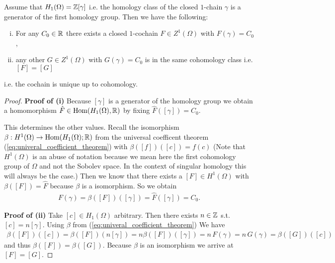 \documentclass[../main.tex]{subfiles}
\begin{document}
\begin{proposition}\label{prop:uniqueness_cochain}
    Assume that $H_1(\Omega) = \mathbb{Z} [\gamma]$ i.e. the homology 
    class of the 
    closed $1$-chain $\gamma$ is a generator of the first homology group.
    Then we have the following:
    \begin{enumerate}[(i)]
        \item For any $C_0 \in \mathbb{R}$ there exists a closed $1$-cochain 
            $F \in Z^1(\Omega)$ with $F(\gamma) = C_0$,
        \item any other $G \in Z^1(\Omega)$ with $G(\gamma) = C_0$ 
            is in the same cohomology class i.e. $[F] = [G]$
    \end{enumerate}
    i.e. the cochain is unique up to cohomology.
\end{proposition}
\begin{proof}
    \textbf{Proof of (i)} %
    Because $[\gamma]$ is a generator of the homology group we  obtain a 
    homomorphism $\hat{F} \in \text{Hom}(H_1(\Omega),\mathbb{R})$ by fixing
    $\hat{F}([\gamma]) = C_0$. 
    
    This determines the other values.
    Recall the isomorphism $\beta : H^1(\Omega) \rightarrow 
    \text{Hom}(H_1(\Omega);\mathbb{R})$ from the universal coefficent theorem 
    (\ref{eq:univeral_coefficient_theorem}) with 
    $\beta([f])([c]) = f(c)$
    (Note that $H^1(\Omega)$ is an abuse of notation 
    because we mean here the first cohomology group of $\Omega$ and not the 
    Sobolev space. In the context of singular homology this will always be the
    case.)
    Then we know that there exists
    a $[F] \in H^1(\Omega)$ with $\beta([F]) = \hat{F}$ because $\beta$ is a 
    isomorphism. So we obtain
    \begin{align*}
        F(\gamma) = \beta([F])([\gamma]) = \hat{F}([\gamma]) = C_0.
    \end{align*}

    \textbf{Proof of (ii)} %
    Take $[c] \in H_1(\Omega)$ arbitrary. 
    Then there exists  $n \in \mathbb{Z}$ s.t.
    $[c] = n [\gamma]$.
    Using $\beta$ from (\ref{eq:univeral_coefficient_theorem})
    We have
    \begin{align*}
        \beta([F])([c]) = \beta([F])(n [\gamma]) 
        = n \beta([F])([\gamma]) = n \, F(\gamma) = n \, G(\gamma) = 
        \beta([G])([c])
    \end{align*}
    and thus $\beta([F]) = \beta([G])$. Because $\beta$ is an isomorphism
    we arrive at $[F] = [G]$.
\end{proof}
\end{document}
